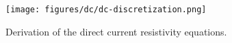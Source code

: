 \begin{figure}[ht]
    \centering
    \texttt{[image: figures/dc/dc-discretization.png]}
    \caption{Derivation of the direct current resistivity equations.}
    \label{fig:dc-discretization}
\end{figure}
